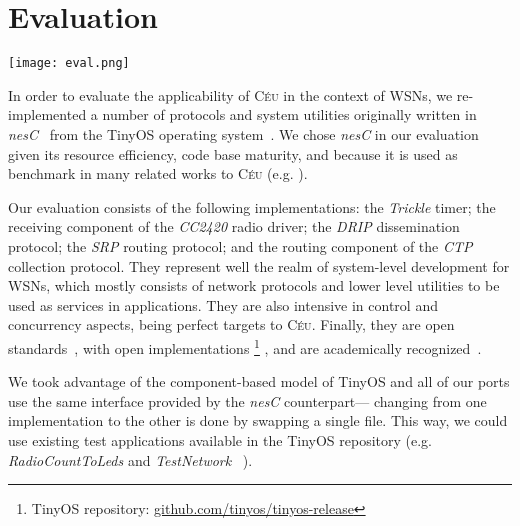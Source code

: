 \documentclass[10pt]{sensys-proc}
\newcommand{\footnoteremember}[2]{%
\footnote{#2}%
\newcounter{#1}%
\setcounter{#1}{\value{footnote}}%
}
\newcommand{\footnoterecall}[1]{%
\footnotemark[\value{#1}]%
}
\newcommand{\CEU}{\textsc{C\'{e}u}\xspace}
\begin{document}

\section{Evaluation}
\label{sec.eval}

\begin{figure*}[t]
\texttt{[image: eval.png]}
\caption{ Comparison between \CEU and \emph{nesC} for the ported applications.
\label{fig.eval}
}
\end{figure*}

In order to evaluate the applicability of \CEU in the context of WSNs, we 
re-implemented a number of protocols and system utilities originally written in 
\emph{nesC}~\cite{wsn.nesc} from the TinyOS operating system~\cite{wsn.tos}.
%
We chose \emph{nesC} in our evaluation given its resource efficiency, code base 
maturity, and because it is used as benchmark in many related works to \CEU 
(e.g.  \cite{wsn.protothreads,wsn.sol,wsn.ocram,wsn.flowtalk}).


Our evaluation consists of the following implementations:
the \emph{Trickle} timer;
the receiving component of the \emph{CC2420} radio driver;
the \emph{DRIP} dissemination protocol;
the \emph{SRP} routing protocol;
and the routing component of the \emph{CTP} collection protocol.
%
They represent well the realm of system-level development for WSNs, which 
mostly consists of network protocols and lower level utilities to be used as 
services in applications.
They are also intensive in control and concurrency aspects, being perfect 
targets to \CEU.
Finally, they are open standards~\cite{wsn.teps}, with open implementations%
\footnoteremember{tos}
    {TinyOS repository: \url{github.com/tinyos/tinyos-release}},
and are academically recognized~\cite{wsn.trickle,wsn.ctp}.


We took advantage of the component-based model of TinyOS and all of our ports 
use the same interface provided by the \emph{nesC} counterpart---
changing from one implementation to the other is done by swapping a single 
file.
This way, we could use existing test applications available in the TinyOS 
repository (e.g. \emph{RadioCountToLeds} and 
\emph{TestNetwork}~\footnoterecall{tos}).
\end{document}
